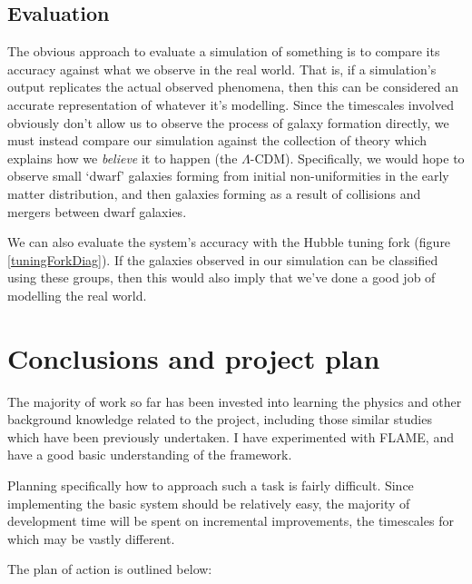 \documentclass[11pt,a4paper]{article}
\begin{document}
\subsection{Evaluation}
\label{evaluation}
The obvious approach to evaluate a simulation of something is to compare its accuracy against what we observe in the real world. That is, if a simulation's output replicates the actual observed phenomena, then this can be considered an accurate representation of whatever it's modelling. Since the timescales involved obviously don't allow us to observe the process of galaxy formation directly, we must instead compare our simulation against the collection of theory which explains how we \emph{believe} it to happen (the $\Lambda$-CDM). Specifically, we would hope to observe small `dwarf' galaxies forming from initial non-uniformities in the early matter distribution, and then galaxies forming as a result of collisions and mergers between dwarf galaxies. 

We can also evaluate the system's accuracy with the Hubble tuning fork (figure \ref{tuningForkDiag}). If the galaxies observed in our simulation can be classified using these groups, then this would also imply that we've done a good job of modelling the real world.

\section{Conclusions and project plan}
\label{plan}
The majority of work so far has been invested into learning the physics and other background knowledge related to the project, including those similar studies which have been previously undertaken. I have experimented with FLAME, and have a good basic understanding of the framework.

Planning specifically how to approach such a task is fairly difficult. Since implementing the basic system should be relatively easy, the majority of development time will be spent on incremental improvements, the timescales for which may be vastly different.

The plan of action is outlined below:
\end{document}
